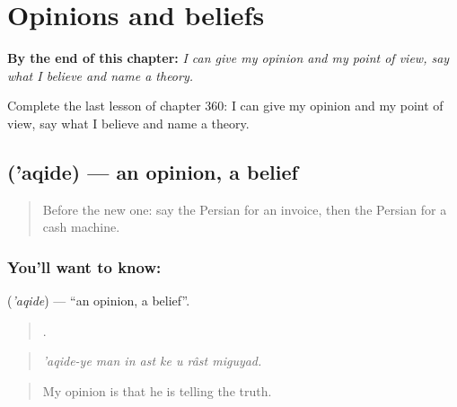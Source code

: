 
\chapter{Opinions and beliefs}
\label{ch:fa-opinions-and-beliefs}

\begin{chapteropening}
\textbf{By the end of this chapter:} \emph{I can give my opinion and my point of view, say what I believe and name a theory.}

Complete the last lesson of chapter 360: I can give my opinion and my point of view, say what I believe and name a theory.
\end{chapteropening}

\section[\texorpdfstring{\fa{عقیده} ('aqide)}{عقیده ('aqide)}]{ ('aqide) — an opinion, a belief}

\label{lesson:FA-C360-aqide}



\begin{quote}
Before the new one: say the Persian for an invoice, then the Persian for a cash machine.
\end{quote}

\subsection*{You'll want to know: }
\textbf{} (\emph{'aqide}) — \textquotedblleft{}an opinion, a belief\textquotedblright{}.

\begin{quote}
       .
\end{quote}

\begin{quote}
\emph{'aqide-ye man in ast ke u râst miguyad.}
\end{quote}

\begin{quote}
My opinion is that he is telling the truth.
\end{quote}

